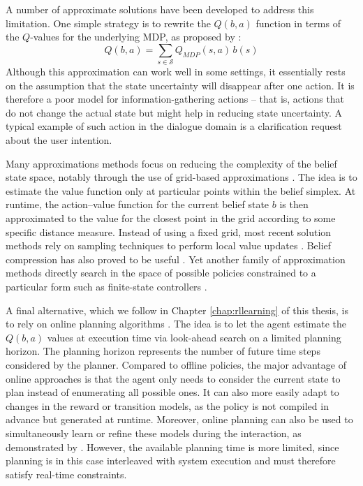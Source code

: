 A number of approximate solutions have been developed to address this limitation.  One simple strategy is to rewrite the $Q(b,a)$ function in terms of the $Q$-values for the underlying MDP, as proposed by \cite{Littman:1997}:
\begin{equation}
Q(b,a) = \sum_{s \in \mathcal{S}} Q_{\mathit{MDP}} (s,a)\, b(s)
\end{equation}
Although this approximation can work well in some settings, it essentially rests on the assumption that the state uncertainty will disappear after one action.  It is therefore a poor model for information-gathering actions -- that is, actions that do not change the actual state but might help in reducing state uncertainty. A typical example of such action in the dialogue domain is a clarification request about the user intention.

Many approximations methods focus on reducing the complexity of the belief state space, notably through the use of grid-based approximations \citep{Zhou:2001}.  The idea is to estimate the value function only at particular points within the belief simplex. At runtime, the action--value function for the current belief state $b$ is then approximated to the value for the closest point in the grid according to some specific distance measure. Instead of using a fixed grid, most recent solution methods rely on sampling techniques to perform local value updates \citep{Pineau_2003,KurHsu08,shani2013}. Belief compression has also proved to be useful \citep{Roy:2005}.  Yet another family of approximation methods directly search in the space of possible policies constrained to a particular form such as finite-state controllers \citep{Hansen98}. 

A final alternative, which we follow in Chapter \ref{chap:rllearning} of this thesis, is to rely on online planning algorithms \citep{ross2008,NIPS2010_0740}.  The idea is to let the agent estimate the $Q(b,a)$ values at execution time via look-ahead search on a limited planning horizon. The planning horizon represents the number of future time steps considered by the planner.  Compared to offline policies, the major advantage of online approaches is that the agent only needs to consider the current state to plan instead of enumerating all possible ones. It can also more easily adapt to changes in the reward or transition models, as the policy is not compiled in advance but generated at runtime. Moreover, online planning can also be used to simultaneously learn or refine these models during the interaction, as demonstrated by \cite{Ross:2011}.  However, the available planning time is more limited, since planning is in this case interleaved with system execution and must therefore satisfy real-time constraints. %

